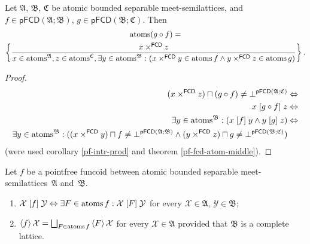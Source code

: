 \begin{prop}
Let $\mathfrak{A}$, $\mathfrak{B}$, $\mathfrak{C}$ be atomic bounded separable meet-semilattices,
and $f\in\mathsf{pFCD}(\mathfrak{A};\mathfrak{B})$,
$g\in\mathsf{pFCD}(\mathfrak{B};\mathfrak{C})$. Then
\begin{multline*}
\operatorname{atoms}(g\circ f)=\\
\left\{ \frac{x\times^{\mathsf{FCD}}z}{x\in\operatorname{atoms}^{\mathfrak{A}},z\in\operatorname{atoms}^{\mathfrak{C}},\exists y\in\operatorname{atoms}^{\mathfrak{B}}:(x\times^{\mathsf{FCD}}y\in\operatorname{atoms} f\land y\times^{\mathsf{FCD}}z\in\operatorname{atoms} g)}\right\}.
\end{multline*}
\end{prop}
\begin{proof}
~
\begin{align*}
(x\times^{\mathsf{FCD}}z)\sqcap(g\circ f)\ne\bot^{\mathsf{pFCD}(\mathfrak{A};\mathfrak{C})} & \Leftrightarrow\\
x\mathrel{\left[g\circ f\right]}z & \Leftrightarrow\\
\exists y\in\operatorname{atoms}^{\mathfrak{B}}:(x\mathrel{\left[f\right]}y\land y\mathrel{\left[g\right]}z) & \Leftrightarrow\\
\exists y\in\operatorname{atoms}^{\mathfrak{B}}:((x\times^{\mathsf{FCD}}y)\sqcap f\ne\bot^{\mathsf{pFCD}(\mathfrak{A};\mathfrak{B})}\land(y\times^{\mathsf{FCD}}z)\sqcap g\ne\bot^{\mathsf{pFCD}(\mathfrak{B};\mathfrak{C})})
\end{align*}
(were used corollary \ref{pf-intr-prod} and theorem \ref{pf-fcd-atom-middle}).\end{proof}
\begin{thm}
Let $f$ be a pointfree funcoid between atomic bounded separable meet-semilattices~$\mathfrak{A}$ and~$\mathfrak{B}$.
\begin{enumerate}
\item \label{pf-r-at}$\mathcal{X}\mathrel{\left[f\right]}\mathcal{Y}\Leftrightarrow\exists F\in\operatorname{atoms} f:\mathcal{X}\mathrel{\left[F\right]}\mathcal{Y}$
for every $\mathcal{X}\in\mathfrak{A}$, $\mathcal{Y}\in\mathfrak{B}$;
\item \label{pf-f-at}$\supfun f\mathcal{X}=\bigsqcup_{F\in\atoms f}\supfun F\mathcal{X}$
for every $\mathcal{X}\in\mathfrak{A}$ provided that $\mathfrak{B}$ is a complete lattice.
\end{enumerate}
\end{thm}
